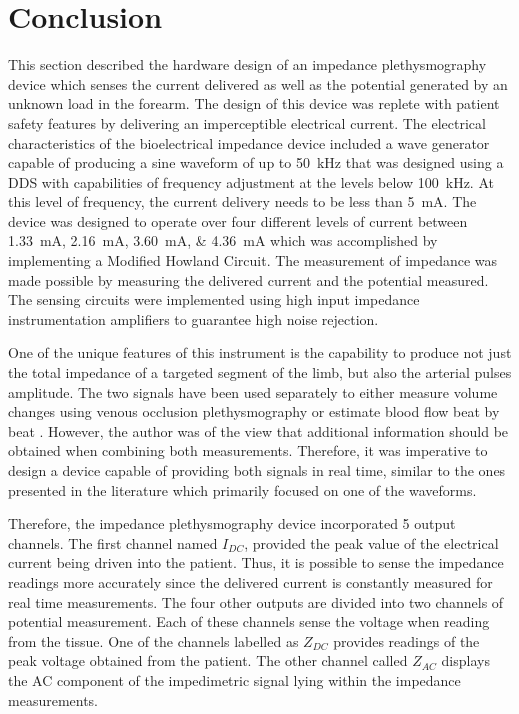 \section{Conclusion}
\label{conclusion impedance device}
This section described the hardware design of an impedance plethysmography device which senses the current delivered as well as the potential generated by an unknown load in the forearm. The design of this device was replete with patient safety features by delivering an imperceptible electrical current. The electrical characteristics of the bioelectrical impedance device included a wave generator capable of producing a sine waveform of up to \SI{50}{\kHz} that was designed using a DDS with capabilities of frequency adjustment at the levels below \SI{100}{\kHz}. At this level of frequency, the current delivery needs to be less than \SI{5}{\mA}. The device was designed to operate over four different levels of current between \SIlist{1.33;2.16;3.60;4.36}{\mA} which was accomplished by implementing a Modified Howland Circuit. The measurement of impedance was made possible by measuring the delivered current and the potential measured. The sensing circuits were implemented using high input impedance instrumentation amplifiers to guarantee high noise rejection. 

One of the unique features of this instrument is the capability to produce not just the total impedance of a targeted segment of the limb, but also the arterial pulses amplitude. The two signals have been used separately to either measure volume changes using venous occlusion plethysmography \cite{mohapatra1979measurement, costeloe1980continuous, yamakoshi1980limb} or estimate blood flow beat by beat  \cite{porter1985measurement, corciova2011peripheral, brown1975impedance, marks1985computer}. However, the author was of the view that additional information should be obtained when combining both measurements. Therefore, it was imperative to design a device capable of providing both signals in real time, similar to the ones presented in the literature which primarily focused on one of the waveforms. 

Therefore, the impedance plethysmography device incorporated 5 output channels. The first channel named $I_{DC}$, provided the peak value of the electrical current being driven into the patient. Thus, it is possible to sense the impedance readings more accurately since the delivered current is constantly measured for real time measurements. The four other outputs are divided into two channels of potential measurement. Each of these channels sense the voltage when reading from the tissue. One of the channels labelled as $Z_{DC}$ provides readings of the peak voltage obtained from the patient. The other channel called $Z_{AC}$ displays the AC component of the impedimetric signal lying within the impedance measurements.  

